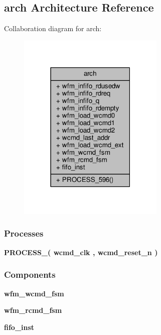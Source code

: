 \subsection{arch Architecture Reference}
\label{classwfm__player_1_1arch}


Collaboration diagram for arch\+:\nopagebreak
\begin{figure}[H]
\begin{center}
\leavevmode
\includegraphics[width=198pt]{d0/d17/classwfm__player_1_1arch__coll__graph}
\end{center}
\end{figure}
\subsubsection*{Processes}
 \begin{DoxyCompactItemize}
\item 
{\bf P\+R\+O\+C\+E\+S\+S\+\_}{\bfseries  ( {\bfseries {\bfseries {\bf wcmd\+\_\+clk}} \textcolor{vhdlchar}{ }} , {\bfseries {\bfseries {\bf wcmd\+\_\+reset\+\_\+n}} \textcolor{vhdlchar}{ }} )}
\end{DoxyCompactItemize}
\subsubsection*{Components}
 \begin{DoxyCompactItemize}
\item 
{\bf wfm\+\_\+wcmd\+\_\+fsm}  {\bfseries }  
\item 
{\bf wfm\+\_\+rcmd\+\_\+fsm}  {\bfseries }  
\item 
{\bf fifo\+\_\+inst}  {\bfseries }  
\end{DoxyCompactItemize}
